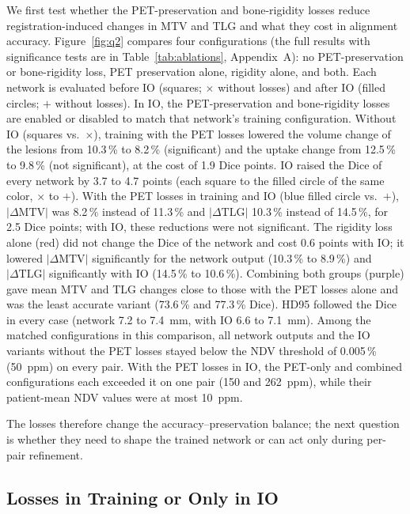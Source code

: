 We first test whether the PET-preservation and bone-rigidity losses reduce registration-induced changes in MTV and TLG and what they cost in alignment accuracy.
Figure~\ref{fig:q2} compares four configurations (the full results with significance tests are in Table~\ref{tab:ablations}, Appendix~A): no PET-preservation or bone-rigidity loss, PET preservation alone, rigidity alone, and both.
Each network is evaluated before IO (squares; $\times$ without losses) and after IO (filled circles; $+$ without losses).
In IO, the PET-preservation and bone-rigidity losses are enabled or disabled to match that network's training configuration.
Without IO (squares vs.\ $\times$), training with the PET losses lowered the volume change of the lesions from 10.3\,\% to 8.2\,\% (significant) and the uptake change from 12.5\,\% to 9.8\,\% (not significant), at the cost of 1.9 Dice points.
IO raised the Dice of every network by 3.7 to 4.7 points (each square to the filled circle of the same color, $\times$ to $+$).
With the PET losses in training and IO (blue filled circle vs.\ $+$), $|\Delta\mathrm{MTV}|$ was 8.2\,\% instead of 11.3\,\% and $|\Delta\mathrm{TLG}|$ 10.3\,\% instead of 14.5\,\%, for 2.5 Dice points; with IO, these reductions were not significant.
The rigidity loss alone (red) did not change the Dice of the network and cost 0.6 points with IO; it lowered $|\Delta\mathrm{MTV}|$ significantly for the network output (10.3\,\% to 8.9\,\%) and $|\Delta\mathrm{TLG}|$ significantly with IO (14.5\,\% to 10.6\,\%).
Combining both groups (purple) gave mean MTV and TLG changes close to those with the PET losses alone and was the least accurate variant (73.6\,\% and 77.3\,\% Dice).
HD95 followed the Dice in every case (network 7.2 to 7.4~mm, with IO 6.6 to 7.1~mm).
Among the matched configurations in this comparison, all network outputs and the IO variants without the PET losses stayed below the NDV threshold of 0.005\,\% (50~ppm) on every pair.
With the PET losses in IO, the PET-only and combined configurations each exceeded it on one pair (150 and 262~ppm), while their patient-mean NDV values were at most 10~ppm.

The losses therefore change the accuracy--preservation balance; the next question is whether they need to shape the trained network or can act only during per-pair refinement.



\subsection{Losses in Training or Only in IO}
\label{sect:res_q2}

